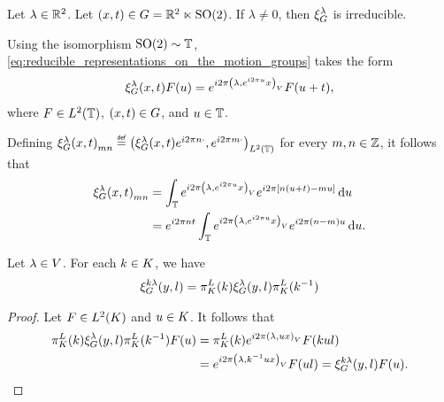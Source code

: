 \begin{example}
    Let $\lambda \in \mathbb{R}^2$.
    Let $(x, t) \in G = \mathbb{R}^2 \ltimes {\mathrm{SO} (2)}$.
    If $\lambda \neq 0$, then $\xi^{\lambda}_{G}$ is irreducible.

    Using the isomorphism ${\mathrm{SO} (2)} \sim \mathbb{T}$,
    \eqref{eq:reducible_representations_on_the_motion_groups} takes the form
    \begin{align*}
        \xi^{\lambda}_{G}(x, t) F(u)
        = e^{i 2 \pi {\left(\lambda, e^{i2 \pi u} x\right)_{V}}} F(u + t),
    \end{align*}
    where $F \in {L^{2} (\mathbb{T})}$, $(x, t) \in G$, and $u \in \mathbb{T}$.

    Defining ${\Rep\lambda(x, t)}_{m n} \defeq \ip[\Lebesgue{2}\T]{\Rep\lambda(x, t) \e^{\i \turn n \dummy}}{\e^{\i \turn m \dummy}}$ for every $m, n \in \mathbb{Z}$,
    it follows that
    \begin{align*}
        {\xi^{\lambda}_{G}(x, t)}_{m n}
        &= \int_{\mathbb{T}} e^{i 2 \pi {\left(\lambda, e^{i2 \pi u} x\right)_{V}}} e^{i 2 \pi [n (u + t) - m u]} \,\mathrm{d} u\\
        &= e^{i 2 \pi n t} \int_{\mathbb{T}} e^{i 2 \pi {\left(\lambda, e^{i2 \pi u} x\right)_{V}}} e^{i 2 \pi (n - m)u} \,\mathrm{d} u.
    \end{align*}
\end{example}

\begin{lemma}
\label{lemma:invariance_property}
    Let $\lambda \in V$.
    For each $k \in K$, we have
    \begin{align*}
        \xi^{k \lambda}_{G}(y, l) = \pi^L_{K}(k) \xi^{\lambda}_{G}(y, l) \pi^L_{K}(k^{-1})
    \end{align*}
\end{lemma}
\begin{proof}
    Let $F \in {L^{2} (K)}$ and $u \in K$.
    It follows that
    \begin{align*}
        \pi^L_{K}(k) \xi^{\lambda}_{G}(y, l) \pi^L_{K}(k^{-1}) F(u)
        &= \pi^L_{K}(k) e^{i 2 \pi {\left(\lambda, u x\right)_{V}}} F(k u l)\\
        &= e^{i 2 \pi {\left(\lambda, k^{-1} u x\right)_{V}}} F(u l)
        = \xi^{k \lambda}_{G}(y, l) F(u).
    \end{align*}
\end{proof}

